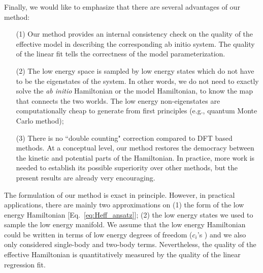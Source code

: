 Finally, we would like to emphasize that there are several advantages of our method: 
\begin{itemize}
\item [(1)] Our method provides an internal consistency check on the quality of the effective model in describing the corresponding ab initio system. The quality of the linear fit tells the correctness of the model parameterization. 
\item [(2)] The low energy space is sampled by low energy states which do not have to be the eigenstates of the system. In other words, we do not need to exactly solve the \textit{ab initio} Hamiltonian or the model Hamiltonian, to know the map that connects the two worlds. The low energy non-eigenstates are computationally cheap to generate from first principles (e.g., quantum Monte Carlo method); 
\item [(3)] There is no ``double counting" correction compared to DFT based methods. At a conceptual level, our method restores the democracy between the kinetic and potential parts of the Hamiltonian. In practice, more work is needed to establish its possible superiority over other methods, but the present results are already very encouraging.
\end{itemize}
The formulation of our method is exact in principle. However, in practical applications, there are mainly two approximations on (1) the form of the low energy Hamiltonian [Eq.~\eqref{eq:Heff_ansatz}]; (2) the low energy states we used to sample the low energy manifold. We assume that the low energy Hamiltonian could be written in terms of low energy degrees of freedom ($c_i$'s ) and we also only considered single-body and two-body terms. Nevertheless, the quality of the effective Hamiltonian is quantitatively measured by the quality of the linear regression fit. 